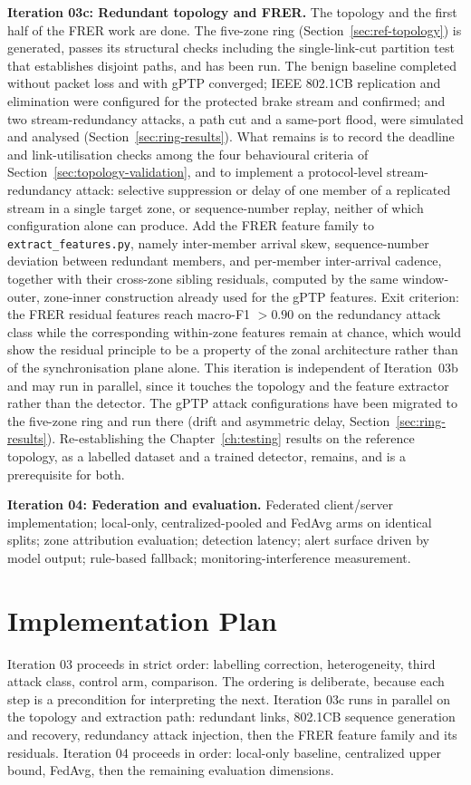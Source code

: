 \textbf{Iteration 03c: Redundant topology and FRER.}
The topology and the first half of the FRER work are done. The five-zone ring
(Section~\ref{sec:ref-topology}) is generated, passes its structural checks including the
single-link-cut partition test that establishes disjoint paths, and has been run. The
benign baseline completed without packet loss and with gPTP converged; IEEE 802.1CB
replication and elimination were configured for the protected brake stream and confirmed;
and two stream-redundancy attacks, a path cut and a same-port flood, were simulated and
analysed (Section~\ref{sec:ring-results}). What remains is to record the deadline and
link-utilisation checks among the four behavioural criteria of
Section~\ref{sec:topology-validation}, and to implement a protocol-level stream-redundancy
attack: selective suppression or delay of one member of a replicated stream in a single
target zone, or sequence-number replay, neither of which configuration alone can
produce. Add the FRER
feature family to \texttt{extract\_features.py}, namely inter-member arrival skew,
sequence-number deviation between redundant members, and per-member inter-arrival
cadence, together with their cross-zone sibling residuals, computed by the same
window-outer, zone-inner construction already used for the gPTP features. Exit
criterion: the FRER residual features reach macro-F1 $> 0.90$ on the redundancy
attack class while the corresponding within-zone features remain at chance, which
would show the residual principle to be a property of the zonal architecture rather
than of the synchronisation plane alone. This iteration is independent of
Iteration~03b and may run in parallel, since it touches the topology and the feature
extractor rather than the detector. The gPTP attack configurations have been migrated to the
five-zone ring and run there (drift and asymmetric delay, Section~\ref{sec:ring-results}).
Re-establishing the Chapter~\ref{ch:testing} results on the reference topology, as a
labelled dataset and a trained detector, remains, and is a prerequisite for both.

\textbf{Iteration 04: Federation and evaluation.}
Federated client/server implementation; local-only, centralized-pooled and FedAvg
arms on identical splits; zone attribution evaluation; detection latency; alert
surface driven by model output; rule-based fallback; monitoring-interference
measurement.

\section{Implementation Plan}
Iteration 03 proceeds in strict order: labelling correction, heterogeneity, third
attack class, control arm, comparison. The ordering is deliberate, because each step is a
precondition for interpreting the next. Iteration 03c runs in parallel on the
topology and extraction path: redundant links, 802.1CB sequence generation and
recovery, redundancy attack injection, then the FRER feature family and its
residuals. Iteration 04 proceeds in order: local-only
baseline, centralized upper bound, FedAvg, then the remaining evaluation dimensions.

